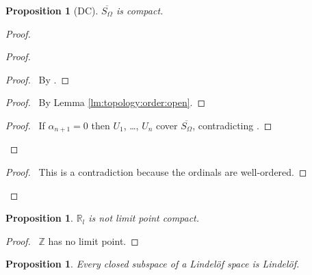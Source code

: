 \documentclass{report}
\let\qed\relax
\newtheorem{prop}[lm]{Proposition}
\theoremstyle{definition}
\begin{document}
 \begin{prop}[DC]
   $\overline{S_\Omega}$ is compact.
 \end{prop}

 \begin{proof}
  \pf
     \pf
   \begin{proof}
     \begin{proof}
       \pf\ By .
     \end{proof}
     \step{<2>3}{\pick\ $\alpha_{n+1} < \alpha_n$ such that $(\alpha_{n+1},
       \alpha_n] \subseteq U_n$}
     \begin{proof}
       \pf\ By Lemma \ref{lm:topology:order:open}.
     \end{proof}
     \begin{proof}
       \pf\ If $\alpha_{n+1} = 0$ then $U_1$, \ldots, $U_n$ cover
       $\overline{S_\Omega}$, contradicting .
     \end{proof}
   \end{proof}
   \qedstep
   \begin{proof}
     \pf\ This is a contradiction because the ordinals are well-ordered.
   \end{proof}
   \qed
 \end{proof}

 \begin{prop}
   $\mathbb{R}_l$ is not limit point compact.
 \end{prop}

 \begin{proof}
   \pf\ $\mathbb{Z}$ has no limit point. \qed
 \end{proof}

 \begin{prop}
   \label{prop:topology:Lindelof:subspace}
   Every closed subspace of a Lindel\"{o}f space is Lindel\"{o}f.
 \end{prop}
\end{document}
